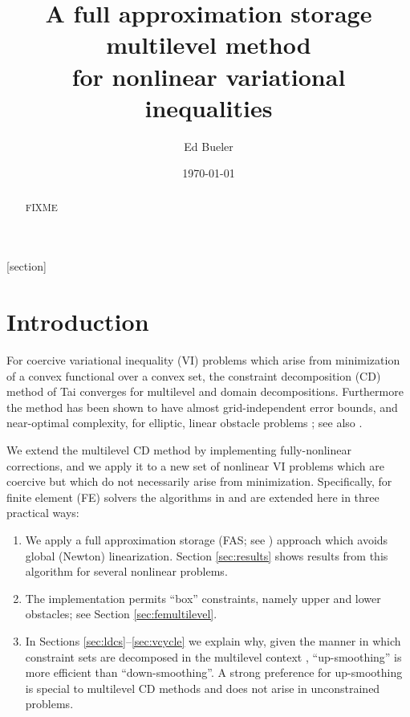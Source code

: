 \documentclass[letterpaper,final,12pt,reqno]{amsart}
\theoremstyle{cstyle}
\theoremstyle{cstyle*}
\theoremstyle{dstyle}
\numberwithin{equation}{section}
\numberwithin{figure}{section}
\numberwithin{table}{section}
\numberwithin{theorem}{section}
\begin{document}
\title[FAS for nonlinear variational inequalities]{A full approximation storage multilevel method \\ for nonlinear variational inequalities}

\author{Ed Bueler}

\date{\today}

\begin{abstract} FIXME
\end{abstract}

\maketitle

\tableofcontents

\thispagestyle{empty}

[section]


\section{Introduction} \label{sec:intro}

For coercive variational inequality (VI) problems which arise from minimization of a convex functional over a convex set, the constraint decomposition (CD) method of Tai \cite{Tai2003} converges for multilevel and domain decompositions.  Furthermore the method has been shown to have almost grid-independent error bounds, and near-optimal complexity, for elliptic, linear obstacle problems \cite[Subsection 5.4]{Tai2003}; see also \cite[Theorem 4.6 and Algorithm 4.7]{GraeserKornhuber2009}.

We extend the multilevel CD method by implementing fully-nonlinear corrections, and we apply it to a new set of nonlinear VI problems which are coercive but which do not necessarily arise from minimization.  Specifically, for finite element (FE) solvers the algorithms in \cite{GraeserKornhuber2009} and \cite{Tai2003} are extended here in three practical ways:
\renewcommand{\labelenumi}{\emph{(\roman{enumi})}}
\begin{enumerate}
\item We apply a full approximation storage (FAS; see \cite{Brandt1977,Bruneetal2015}) approach which avoids global (Newton) linearization.  Section \ref{sec:results} shows results from this  algorithm for several nonlinear problems.
\item The  implementation permits ``box'' constraints, namely upper and lower obstacles; see Section \ref{sec:femultilevel}.
\item In Sections \ref{sec:ldcs}--\ref{sec:vcycle} we explain why, given the manner in which constraint sets are decomposed in the multilevel context \cite{GraeserKornhuber2009}, ``up-smoothing'' is more efficient than ``down-smoothing''.  A strong preference for up-smoothing is special to multilevel CD methods and does not arise in unconstrained problems.
\end{enumerate}
\end{document}
